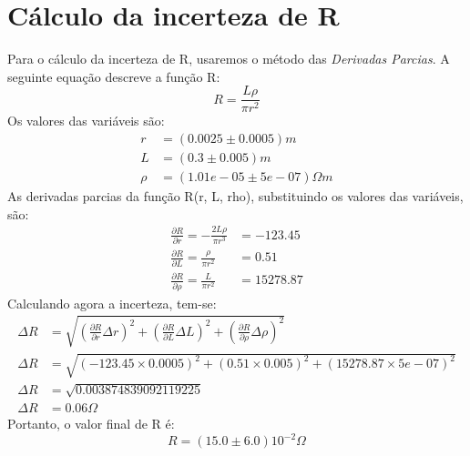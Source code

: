 \documentclass{article}
\begin{document}
 \section{Cálculo da incerteza de R}Para o cálculo da incerteza de R, usaremos o método das \emph{Derivadas Parcias}. A seguinte equação descreve a função R: \\\begin{equation} 
 R = \frac{L \rho}{\pi r^{2}}
\end{equation} 
Os valores das variáveis são:
 \begin{align*} 
r &= (0.0025\pm 0.0005) m\\ L &= (0.3\pm 0.005) m\\ \rho &= (1.01e-05\pm 5e-07) \Omega m
 \end{align*} 
As derivadas parcias da função R({r, L, rho}), substituindo os valores das variáveis, são: 
\begin{align}
 \frac{\partial R}{\partial r} = - \frac{2 L \rho}{\pi r^{3}}&= -123.45\\ \frac{\partial R}{\partial L} = \frac{\rho}{\pi r^{2}}&= 0.51\\ \frac{\partial R}{\partial \rho} = \frac{L}{\pi r^{2}}&= 15278.87
\end{align}
Calculando agora a incerteza, tem-se: 
\begin{align} 
 \Delta R &= \sqrt{\left( \frac{\partial R}{\partial r}\Delta r\right)^{ 2 } + \left( \frac{\partial R}{\partial L}\Delta L\right)^{ 2 } + \left( \frac{\partial R}{\partial \rho}\Delta \rho\right)^{ 2 }} \\ \Delta R &= \sqrt{\left(-123.45\times 0.0005\right)^{ 2 } + \left(0.51\times 0.005\right)^{ 2 } + \left(15278.87\times 5e-07\right)^{ 2 }} \\ \Delta R &= \sqrt{0.003874839092119225} \\ \Delta R &= 0.06 \Omega
 \end{align}
 Portanto, o valor final de R é:
 \begin{equation} 
 \boxed{ R = \left(15.0 \pm 6.0\right) 10^{ -2} \Omega}
 \end{equation}
\end{document}
